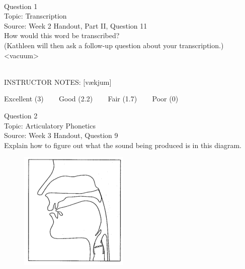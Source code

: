\documentclass[12pt]{article}
\begin{document}
\begin{center}
\textbf{{\color{red}{\HUGE END OF EXAM}}}\\

\end{center}
\newpage

\begin{center}
\textbf{{\color{blue}{\HUGE START OF EXAM\\}}}

\textbf{{\color{blue}{\HUGE Student ID: 33446\\}}}

\textbf{{\color{blue}{\HUGE \\}}}

\end{center}
\newpage

{\large Question 1}\\

Topic: Transcription\\
Source: Week 2 Handout, Part II, Question 11\\

How would this word be transcribed?\\ (Kathleen will then ask a follow-up question about your transcription.)\\

<vacuum>


~\\
INSTRUCTOR NOTES: [vækjum]


\vfill
Excellent (3) ~~~ Good (2.2) ~~~ Fair (1.7) ~~~ Poor (0)
\newpage

{\large Question 2}\\

Topic: Articulatory Phonetics\\
Source: Week 3 Handout, Question 9\\

Explain how to figure out what the sound being produced is in this diagram.\\

\begin{figure}[H]
\includegraphics{../images/sagittal_eth.png}
\end{figure}
\end{document}
